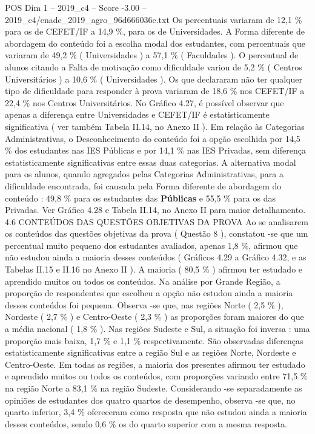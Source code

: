 \begin{textsample}{POS Dim 1 – 2019\_c4 – Score -3.00 – 2019\_c4/enade\_2019\_agro\_96d666036e.txt}
Os percentuais variaram de 12,1 \% para os de CEFET/IF a 14,9 \%, para os de Universidades.
A Forma diferente de abordagem do conteúdo foi a escolha modal dos estudantes, com percentuais que variaram de 49,2 \% ( Universidades ) a 57,1 \% ( Faculdades ).
O percentual de alunos citando a Falta de motivação como dificuldade variou de 5,2 \% ( Centros Universitários ) a 10,6 \% ( Universidades ).
Os que declararam não ter qualquer tipo de dificuldade para responder à prova variaram de 18,6 \% nos CEFET/IF a 22,4 \% nos Centros Universitários.
No Gráfico 4.27, é possível observar que apenas a diferença entre Universidades e CEFET/IF é estatisticamente significativa ( ver também Tabela II.14, no Anexo II ).
Em relação às Categorias Administrativas, o Desconhecimento do conteúdo foi a opção escolhida por 14,5 \% dos estudantes nas IES Públicas e por 14,1 \% nas IES Privadas, sem diferença estatisticamente significativas entre essas duas categorias.
A alternativa modal para os alunos, quando agregados pelas Categorias Administrativas, para a dificuldade encontrada, foi causada pela Forma diferente de abordagem do conteúdo : 49,8 \% para os estudantes das \textbf{Públicas} e 55,5 \% para os das Privadas.
Ver Gráfico 4.28 e Tabela II.14, no Anexo II para maior detalhamento. 4.6 CONTEÚDOS DAS QUESTÕES OBJETIVAS DA PROVA Ao se analisarem os conteúdos das questões objetivas da prova ( Questão 8 ), constatou -se que um percentual muito pequeno dos estudantes avaliados, apenas 1,8 \%, afirmou que não estudou ainda a maioria desses conteúdos ( Gráficos 4.29 a Gráfico 4.32, e as Tabelas II.15 e II.16 no Anexo II ).
A maioria ( 80,5 \% ) afirmou ter estudado e aprendido muitos ou todos os conteúdos.
Na análise por Grande Região, a proporção de respondentes que escolheu a opção não estudou ainda a maioria desses conteúdos foi pequena.
Observa -se que, nas regiões Norte ( 2,5 \% ), Nordeste ( 2,7 \% ) e Centro-Oeste ( 2,3 \% ) as proporções foram maiores do que a média nacional ( 1,8 \% ).
Nas regiões Sudeste e Sul, a situação foi inversa : uma proporção mais baixa, 1,7 \% e 1,1 \% respectivamente.
São observadas diferenças estatisticamente significativas entre a região Sul e as regiões Norte, Nordeste e Centro-Oeste.
Em todas as regiões, a maioria dos presentes afirmou ter estudado e aprendido muitos ou todos os conteúdos, com proporções variando entre 71,5 \% na região Norte a 83,1 \% na região Sudeste.
Considerando -se separadamente as opiniões de estudantes dos quatro quartos de desempenho, observa -se que, no quarto inferior, 3,4 \% ofereceram como resposta que não estudou ainda a maioria desses conteúdos, sendo 0,6 \% os do quarto superior com a mesma resposta.

\end{textsample}
